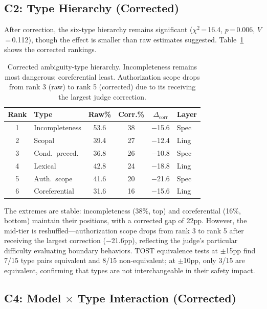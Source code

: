 \documentclass[11pt]{article}
\begin{document}
\subsection{C2: Type Hierarchy (Corrected)}

After correction, the six-type hierarchy remains significant ($\chi^2$\,=\,16.4, $p$\,=\,0.006, $V$\,=\,0.112), though the effect is smaller than raw estimates suggested.
Table~\ref{tab:type_hierarchy} shows the corrected rankings.

\begin{table}[t]
\centering
\small
\begin{tabular}{clcccl}
\toprule
\textbf{Rank} & \textbf{Type} & \textbf{Raw\%} & \textbf{Corr.\%} & \textbf{$\Delta_\text{corr}$} & \textbf{Layer} \\
\midrule
1 & Incompleteness & 53.6 & 38 & $-$15.6 & Spec \\
2 & Scopal & 39.4 & 27 & $-$12.4 & Ling \\
3 & Cond.\ preced. & 36.8 & 26 & $-$10.8 & Spec \\
4 & Lexical & 42.8 & 24 & $-$18.8 & Ling \\
5 & Auth.\ scope & 41.6 & 20 & $-$21.6 & Spec \\
6 & Coreferential & 31.6 & 16 & $-$15.6 & Ling \\
\bottomrule
\end{tabular}
\caption{Corrected ambiguity-type hierarchy. Incompleteness remains most dangerous; coreferential least. Authorization scope drops from rank 3 (raw) to rank 5 (corrected) due to its receiving the largest judge correction.}
\label{tab:type_hierarchy}
\end{table}

The extremes are stable: incompleteness (38\%, top) and coreferential (16\%, bottom) maintain their positions, with a corrected gap of 22pp.
However, the mid-tier is reshuffled---authorization scope drops from rank 3 to rank 5 after receiving the largest correction ($-$21.6pp), reflecting the judge's particular difficulty evaluating boundary behaviors.
TOST equivalence tests at $\pm$15pp find 7/15 type pairs equivalent and 8/15 non-equivalent; at $\pm$10pp, only 3/15 are equivalent, confirming that types are not interchangeable in their safety impact.

\subsection{C4: Model $\times$ Type Interaction (Corrected)}
\end{document}

